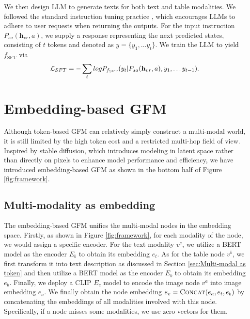  We then design LLM to generate texts for both text and table modalities. We followed the standard instruction tuning practice \citep{zhang2023instruction,peng2023instruction}, which encourages LLMs to adhere to user requests when returning the outputs. For the input instruction $P_{sa}(\mathbf{h}_{vr},a)$, we supply a response representing the next predicted states, consisting of $t$ tokens and denoted as $y=\{y_1, \ldots y_t\}$. We train the LLM to yield $f_{\text{SFT}}$ via
\vspace{-1mm}
\begin{equation}\label{equ:sft}
\hspace{-1mm}\mathcal{L}_{SFT}=-\sum_{t}logP_{f_{\text{SFT}}}(y_t|P_{sa}(\mathbf{h}_{vr},a),y_1, \ldots y_{t-1}).
\end{equation}
\vspace{-7mm}





\section{Embedding-based GFM}\label{sec:Embedding-based GFM} 

Although token-based GFM can relatively simply construct a multi-modal world, it is still limited by the high token cost and a restricted multi-hop field of view. Inspired by stable diffusion, which introduces modeling in latent space rather than directly on pixels to enhance model performance and efficiency, we have introduced embedding-based GFM as shown in the bottom half of Figure \ref{fig:framework}.

\vspace{-1mm}
\subsection{Multi-modality as embedding} The embedding-based GFM unifies the multi-modal nodes in the embedding space. Firstly, as shown in Figure \ref{fig:framework}, for each modality of the node, we would assign a specific encoder. For the text modality  $ v^e$, we utilize a BERT model as the encoder $E_{b}$ to obtain its embedding $e_{t}$. As for the table node $ v^b$, we first transform it into text description as discussed in Section \ref{sec:Multi-modal as token} and then utilize a BERT model as the encoder $E_{b}$ to obtain its embedding $e_{b}$. Finally, we deploy a CLIP $E_{c}$ model to encode the image node $ v^a$ into image embedding $e_{a}$. We finally obtain the node embedding $e_v=\textsc{Concat}(e_{a},e_{t},e_{b})$ by concatenating the embeddings of all modalities involved with this node. Specifically, if a node misses some modalities, we use zero vectors for them.

